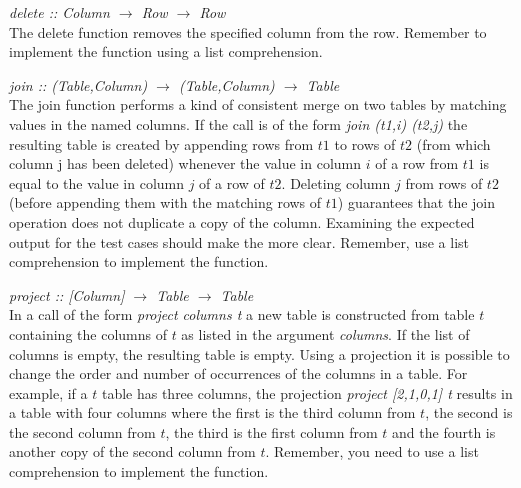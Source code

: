 \documentclass[11pt]{article}
\begin{document}
\begin{description} 
\item{{\it{delete :: Column $\rightarrow$ Row $\rightarrow$ Row}}} \\The delete
function removes the specified column from the row.  Remember to implement the
function using a list comprehension.

\item{{\it{join :: (Table,Column) $\rightarrow$ (Table,Column) $\rightarrow$
Table}}} \\ The join function performs a kind of consistent merge on two tables
by matching values in the named columns.  If the call is of the form {\it{join
(t1,i) (t2,j)}} the resulting table is created by appending rows from $t1$ to
rows of $t2$ (from which column j has been deleted) whenever the value in
column $i$ of a row from $t1$ is equal to the value in column $j$ of a row of
$t2$. Deleting column $j$ from rows of $t2$ (before appending them with the
matching rows of $t1$) guarantees that the join operation does not duplicate a
copy of the column.  Examining the expected output for the test cases should
make the more clear. Remember, use a list comprehension to implement the
function.

\item{{\it{project :: [Column] $\rightarrow$ Table $\rightarrow$ Table }}} \\In
a call of the form {\it{project columns t}} a new table is constructed from
table $t$ containing the columns of $t$ as listed in the argument
{\it{columns}}.  If the list of columns is empty, the resulting table is
empty. Using a projection it is possible to change the order and number of
occurrences of the columns in a table.  For example, if a $t$ table has three
columns, the projection {\it{project [2,1,0,1] t}} results in a table with four
columns where the first is the third column from $t$, the second is the second
column from $t$, the third is the first column from $t$ and the fourth is
another copy of the second column from $t$. Remember, you need to use a list
comprehension to implement the function.
\end{description}
\end{document}
